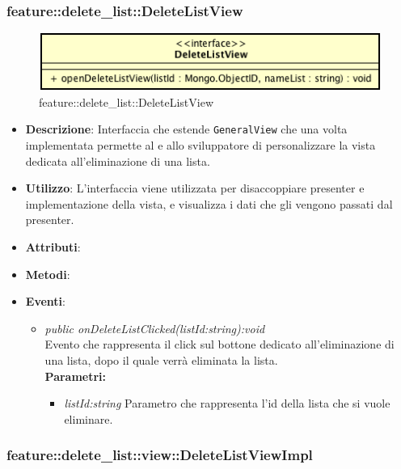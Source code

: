 \subsubsection{feature::delete\_list::DeleteListView}

\label{feature::delete_list::DeleteListView}
\begin{figure}[H]
	\centering
	\includegraphics[scale=0.5]{Sezioni/SottosezioniST/img/app/DeleteListView.png}
	\caption{feature::delete\_list::DeleteListView}
\end{figure}

\begin{itemize}
\item \textbf{Descrizione}: Interfaccia che estende \texttt{GeneralView} che una volta implementata permette al  e allo sviluppatore di personalizzare la vista dedicata all'eliminazione di una lista.
\item \textbf{Utilizzo}: L'interfaccia viene utilizzata per disaccoppiare presenter e implementazione della vista, e visualizza i dati che gli vengono passati dal presenter.
\item \textbf{Attributi}: 
\item \textbf{Metodi}:
\item \textbf{Eventi}:
	\begin{itemize}
	\item \textit{public onDeleteListClicked(listId:string):void}\\
	Evento che rappresenta il click sul bottone dedicato all'eliminazione di una lista, dopo il quale verrà eliminata la lista.
	\\ \textbf{Parametri:} \begin{itemize}
	\item \textit{listId:string}
	Parametro che rappresenta l'id della lista che si vuole eliminare.
	\end{itemize} 
	\end{itemize}
\end{itemize}

\subsubsection{feature::delete\_list::view::DeleteListViewImpl}

